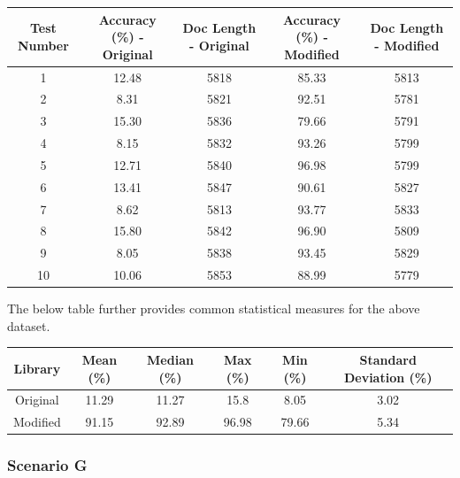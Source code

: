 \documentclass[9pt, titlepage]{article}
\begin{document}
  \begin{center}
    \begin{tabular}{||c c c c c||} 
      \hline
      Test Number & Accuracy (\%) - Original & Doc Length - Original & Accuracy (\%) - Modified & Doc Length - Modified \\ [0.5ex] 
      \hline\hline
      1 & 12.48 & 5818 & 85.33 & 5813 \\ 
      \hline
      2 &  8.31 & 5821 & 92.51 & 5781 \\ 
      \hline
      3 & 15.30 & 5836 & 79.66 & 5791 \\ 
      \hline
      4 &  8.15 & 5832 & 93.26 & 5799 \\ 
      \hline
      5 & 12.71 & 5840 & 96.98 & 5799 \\ 
      \hline
      6 & 13.41 & 5847 & 90.61 & 5827 \\ 
      \hline
      7 &  8.62 & 5813 & 93.77 & 5833 \\ 
      \hline
      8 & 15.80 & 5842 & 96.90 & 5809 \\ 
      \hline
      9 &  8.05 & 5838 & 93.45 & 5829 \\ 
      \hline
      10 & 10.06 & 5853 & 88.99 & 5779 \\ 
      \hline
    \end{tabular}
  \end{center}
  
  The below table further provides common statistical measures for the above dataset.\\

  \begin{center}
    \begin{tabular}{||c c c c c c||} 
      \hline
      Library & Mean (\%) & Median (\%) & Max (\%) & Min (\%) & Standard Deviation (\%) \\ [0.5ex] 
      \hline\hline
      Original & 11.29 & 11.27 & 15.8 & 8.05 & 3.02 \\ 
      \hline
      Modified & 91.15 & 92.89 & 96.98 & 79.66 & 5.34 \\
      \hline
    \end{tabular}
  \end{center}
  \hfill

  
  \subsubsection{Scenario G}
  
\end{document}
